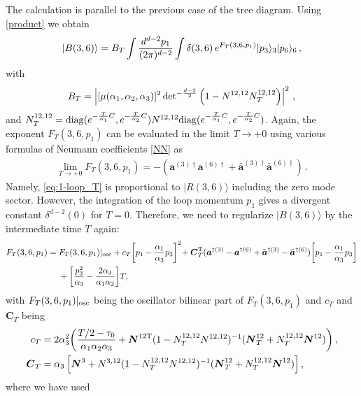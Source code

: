 \documentclass[12pt]{article}
\begin{document}
The calculation is parallel to the previous case of the tree diagram.
Using \eqref{product} we obtain
\begin{align}
|B(3,6)\rangle
=B_T\int{d^{d-2}p_1 \over(2\pi)^{d-2}}\int\delta(3,6)
\,e^{F_{T}(3,6,p_1)}|p_3\rangle_3|p_6\rangle_6\,,
\label{eq:1-loop_T}
\end{align}
with 
\begin{align}
B_T=\left|[\mu(\alpha_1,\alpha_2,\alpha_3)]^2\,{\det}^{-{d-2\over 2}}
\left(1-N^{12,12}N^{12,12}_T\right)\right|^2\,,
\end{align}
and $N^{12,12}_T
={\rm diag}(e^{-{T\over\alpha_1}C},e^{-{T\over\alpha_2}C})N^{12,12}
{\rm diag}(e^{-{T\over\alpha_1}C},e^{-{T\over\alpha_2}C})$.
Again, the exponent $F_T(3,6,p_1)$ can be evaluated in the limit 
$T\to +0$ using various formulas of Neumann coefficients \eqref{NN} as
\begin{align}
\lim_{T\rightarrow +0}F_T(3,6,p_1)
=-(\boldsymbol{a}^{(3)\dagger}\boldsymbol{a}^{(6)\dagger}
+\bar{\boldsymbol{a}}^{(3)\dagger}
\bar{\boldsymbol{a}}^{(6)\dagger})\,.
\label{FT0}
\end{align}
Namely, \eqref{eq:1-loop_T} is proportional to $|R(3,6)\rangle$
including the zero mode sector.
However, the integration of the loop momentum $p_1$ gives a divergent
constant $\delta^{d-2}(0)$ for $T=0$.
Therefore, we need to regularize $|B(3,6)\rangle$ by the intermediate
time $T$ again:
\begin{align}
F_{T}(3,6,p_1)&=F_{T}(3,6,p_1)|_{{\rm osc}}
+c_{T}\biggl[p_1-\frac{\alpha_1}{\alpha_3}p_3\biggr]^2\!
+\boldsymbol{C}_{T}^{\rm T}
(\boldsymbol{a}^{\dagger(3)}-\boldsymbol{a}^{\dagger(6)}
+\bar{\boldsymbol{a}}^{\dagger(3)}-\bar{\boldsymbol{a}}^{\dagger(6)})
\biggl[p_1-\frac{\alpha_1}{\alpha_3}p_3\biggr]\nonumber\\
&~~~~+\biggl[\frac{p_3^2}{\alpha_3}-\frac{2\alpha_3}{\alpha_1\alpha_2}\biggl]T,
\end{align}
with $F_T(3,6,p_1)|_{\rm osc}$ being the oscillator bilinear part of
$F_T(3,6,p_1)$ and $c_T$ and $\boldsymbol{C}_{T}$ being
\begin{align}
c_{T}&=2\alpha_3^2\biggl({T/2-\tau_0\over\alpha_1\alpha_2\alpha_3}
+\boldsymbol{N}^{12{\rm T}}
(1-N^{12,12}_TN^{12,12})^{-1}
(\boldsymbol{N}^{12}_T+N^{12,12}_T\boldsymbol{N}^{12})\biggr)\,,\\
\boldsymbol{C}_{T}
&=\alpha_3\left[\boldsymbol{N}^{3}
+N^{3,12}(1-N^{12,12}_TN^{12,12})^{-1}
(\boldsymbol{N}^{12}_T+N^{12,12}_T\boldsymbol{N}^{12})\right],
\end{align}
where we have used 
\end{document}
